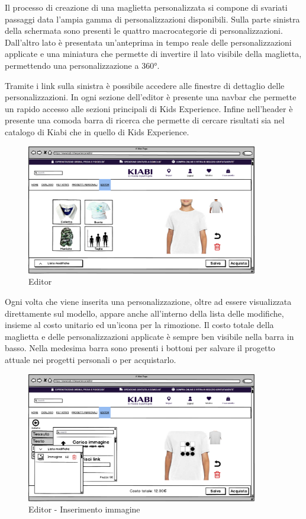 \documentclass[12pt,italian,]{report}
\begin{document}
Il processo di creazione di una maglietta personalizzata si compone di svariati passaggi data l'ampia gamma di personalizzazioni disponibili.
Sulla parte sinistra della schermata sono presenti le quattro
macrocategorie di personalizzazioni. Dall'altro lato è presentata un'anteprima in tempo reale delle personalizzazioni applicate e una miniatura che permette di invertire il lato visibile della maglietta, permettendo una personalizzazione a 360°.

Tramite i link sulla sinistra è possibile accedere alle finestre di dettaglio delle personalizzazioni. In ogni sezione dell'editor è presente una navbar che permette un rapido accesso alle sezioni principali di Kids Experience. Infine nell'header è presente una comoda barra di ricerca che permette di cercare risultati sia nel catalogo di Kiabi che
in quello di Kids Experience.

\begin{figure}[h]
\centering
\includegraphics[width=0.9\textwidth]{../balsamiq/balsamiq_finale/Editorbase.png}
\caption{Editor}
\end{figure}

Ogni volta che viene inserita una personalizzazione, oltre ad essere visualizzata direttamente sul modello, appare anche all'interno della lista delle modifiche, insieme al costo unitario ed un'icona per la rimozione. Il costo totale della maglietta e delle personalizzazioni applicate è sempre ben visibile nella barra in basso.
Nella medesima barra sono presenti i bottoni per salvare il progetto attuale nei progetti personali o per acquistarlo.

\begin{figure}[h]
\centering
\includegraphics[width=0.9\textwidth]{../balsamiq/balsamiq_finale/Editor-caratteristicabustoimmagine4.png}
\caption{Editor - Inserimento immagine}
\end{figure}
\end{document}
